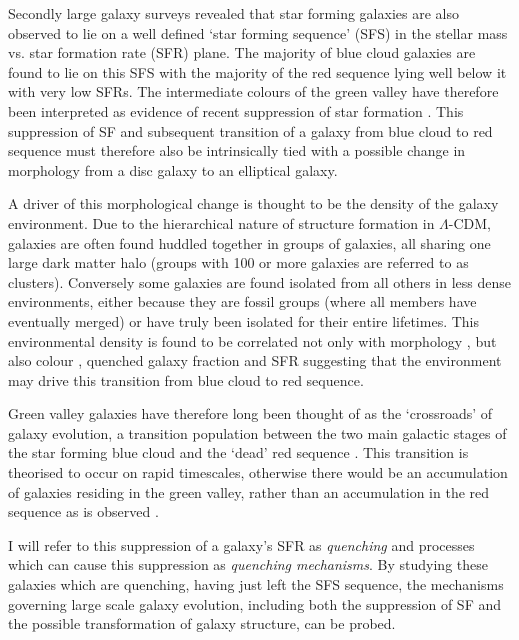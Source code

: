 Secondly large galaxy surveys revealed that star forming galaxies are also observed to lie on a well defined `star forming sequence' (SFS) in the stellar mass vs. star formation rate (SFR) plane. The majority of blue cloud galaxies are found to lie on this SFS with the majority of the red sequence lying well below it with very low SFRs. The intermediate colours of the green valley have therefore been interpreted as evidence of recent suppression of star formation \citep[SF;][]{Salim07}. This suppression of SF and subsequent transition of a galaxy from blue cloud to red sequence must therefore also be intrinsically tied with a possible change in morphology from a disc galaxy to an elliptical galaxy.

A driver of this morphological change is thought to be the density of the galaxy environment. Due to the hierarchical nature of structure formation in $\Lambda$-CDM, galaxies are often found huddled together in groups of galaxies, all sharing one large dark matter halo (groups with 100 or more galaxies are referred to as clusters). Conversely some galaxies are found isolated from all others in less dense environments, either because they are fossil groups (where all members have eventually merged) or have truly been isolated for their entire lifetimes. This environmental density is found to be correlated not only with morphology \citep{dressler80, smail97, poggianti99, postman05, Bamford09}, but also colour \citep{butcher78, pimbblet02}, quenched galaxy fraction \citep{kauffmann03, Baldry06, peng12, darvish16} and SFR \citep{gomez03} suggesting that the environment may drive this transition from blue cloud to red sequence. 

Green valley galaxies have therefore long been thought of as the `crossroads' of galaxy evolution, a transition population between the two main galactic stages of the star forming blue cloud and the `dead' red sequence \citep{Bell04, Wyder07, Schim07, Martin07, Faber07, Mendez11, Gonc12, schawinski14, Pan14}. This transition is theorised to occur on rapid timescales, otherwise there would be an accumulation of galaxies residing in the green valley, rather than an accumulation in the red sequence as is observed \citep{Arnouts07, Martin07}.

I will refer to this suppression of a galaxy's SFR as \emph{quenching} and processes which can cause this suppression as \emph{quenching mechanisms}. By studying these galaxies which are quenching, having just left the SFS sequence, the mechanisms governing large scale galaxy evolution, including both the suppression of SF and the possible transformation of galaxy structure, can be probed. 

